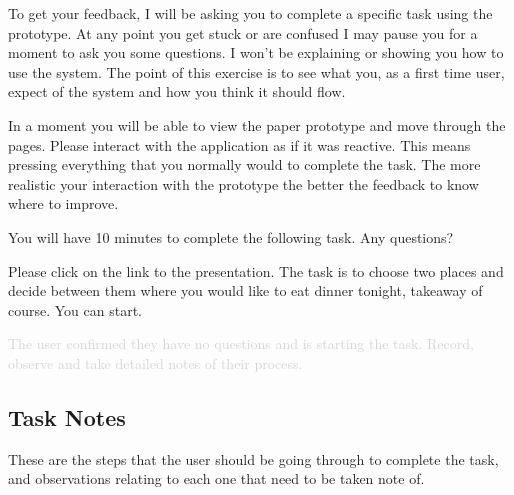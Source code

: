        \begin{itshape}
            To get your feedback, I will be asking you to complete a specific task using the prototype. At any point you get stuck or are confused I may pause you for a moment to ask you some questions. I won’t be explaining or showing you how to use the system. The point of this exercise is to see what you, as a first time user, expect of the system and how you think it should flow.

            In a moment you will be able to view the paper prototype and move through the pages. Please interact with the application as if it was reactive. This means pressing everything that you normally would to complete the task. The more realistic your interaction with the prototype the better the feedback to know where to improve. 

            You will have 10 minutes to complete the following task. Any questions? 

            Please click on the link to the presentation. The task is to choose two places and decide between them where you would like to eat dinner tonight, takeaway of course. You can start.
        \end{itshape}

        \textcolor{lightgray}{The user confirmed they have no questions and is starting the task.  Record, observe and take detailed notes of their process.}

    \subsection*{Task Notes}
        These are the steps that the user should be going through to complete the task, and observations relating to each one that need to be taken note of.

